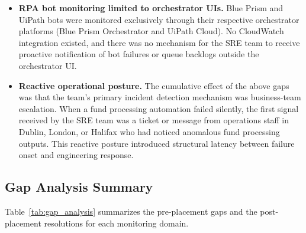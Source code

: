 \begin{itemize}
    \item \textbf{RPA bot monitoring limited to orchestrator UIs.}
          Blue Prism and UiPath bots were monitored exclusively through
          their respective orchestrator platforms (Blue Prism Orchestrator and
          UiPath Cloud). No CloudWatch integration existed, and there
          was no mechanism for the SRE team to receive proactive
          notification of bot failures or queue backlogs outside the
          orchestrator UI.

    \item \textbf{Reactive operational posture.} The cumulative effect
          of the above gaps was that the team's primary incident
          detection mechanism was business-team escalation. When a fund
          processing automation failed silently, the first signal
          received by the SRE team was a ticket or message from
          operations staff in Dublin, London, or Halifax who had noticed
          anomalous fund processing outputs. This reactive posture
          introduced structural latency between failure onset and
          engineering response.
\end{itemize}

\subsection{Gap Analysis Summary}

Table~\ref{tab:gap_analysis} summarizes the pre-placement gaps and the
post-placement resolutions for each monitoring domain.

